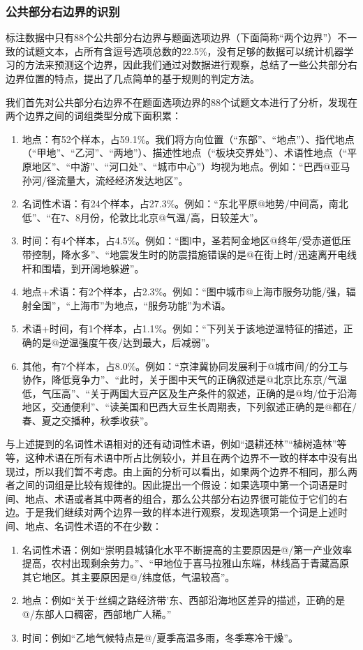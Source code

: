 \documentclass[master, winfont]{njuthesis}
\begin{document}
\subsubsection{公共部分右边界的识别}
标注数据中只有88个公共部分右边界与题面选项边界（下面简称“两个边界”）不一致的试题文本，占所有含逗号选项总数的22.5\%，没有足够的数据可以统计机器学习的方法来预测这个边界，因此我们通过对数据进行观察，总结了一些公共部分右边界位置的特点，提出了几点简单的基于规则的判定方法。

我们首先对公共部分右边界不在题面选项边界的88个试题文本进行了分析，发现在两个边界之间的词组类型分成下面积累：
\begin{enumerate}
	\item 地点：有52个样本，占59.1\%。我们将方向位置（“东部”、“地点”）、指代地点（“甲地”、“乙河”、“两地”）、描述性地点（“板块交界处”）、术语性地点（“平原地区”、“中游”、“河口处”、“城市中心”）均视为地点。例如：“巴西@亚马孙河/径流量大，流经经济发达地区”。
	\item 名词性术语：有24个样本，占27.3\%。例如：“东北平原@地势/中间高，南北低”、“在7、8月份，伦敦比北京@气温/高，日较差大”。
	\item 时间：有4个样本，占4.5\%。例如：“图l中，圣若阿金地区@终年/受赤道低压带控制，降水多”、“地震发生时的防震措施错误的是@在街上时/迅速离开电线杆和围墙，到开阔地躲避”。
	\item 地点+术语：有2个样本，占2.3\%。例如：“图中城市@上海市服务功能/强，辐射全国”，“上海市”为地点，“服务功能”为术语。
	\item 术语+时间，有1个样本，占1.1\%。例如：“下列关于该地逆温特征的描述，正确的是@逆温强度午夜/达到最大，后减弱”。
	\item 其他，有7个样本，占8.0\%。例如：“京津冀协同发展利于@城市间/的分工与协作，降低竞争力”、“此时，关于图中天气的正确叙述是@北京比东京/气温低，气压高”、“关于两国大豆产区及生产条件的叙述，正确的是@均/位于沿海地区，交通便利”、“读美国和巴西大豆生长周期表，下列叙述正确的是@都在/春、夏之交播种，秋季收获”。
\end{enumerate}

与上述提到的名词性术语相对的还有动词性术语，例如“退耕还林”“植树造林”等等，这种术语在所有术语中所占比例较小，并且在两个边界不一致的样本中没有出现过，所以我们暂不考虑。由上面的分析可以看出，如果两个边界不相同，那么两者之间的词组是比较有规律的。因此提出一个假设：如果选项中第一个词语是时间、地点、术语或者其中两者的组合，那么公共部分右边界很可能位于它们的右边。于是我们继续对两个边界一致的样本进行观察，发现选项第一个词是上述时间、地点、名词性术语的不在少数：
\begin{enumerate}
	\item 名词性术语：例如“崇明县城镇化水平不断提高的主要原因是@/第一产业效率提高，农村出现剩余劳力。”、“甲地位于喜马拉雅山东端，林线高于青藏高原其它地区。其主要原因是@/纬度低，气温较高”。
	\item 地点：例如“关于‘丝绸之路经济带’东、西部沿海地区差异的描述，正确的是@/东部人口稠密，西部地广人稀。”
	\item 时间：例如“乙地气候特点是@/夏季高温多雨，冬季寒冷干燥”。
\end{enumerate}
\end{document}

